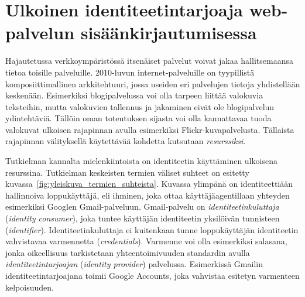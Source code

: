 \documentclass[finnish,gradu]{tktltiki}
\begin{document}



\newpage
\section{Ulkoinen identiteetintarjoaja web-palvelun sisäänkirjautumisessa} %
\label{sec:kakkosluku}

  Hajautetussa verkkoympäristössä itsenäiset palvelut voivat jakaa hallitsemaansa tietoa toisille palveluille. 2010-luvun internet-palveluille on tyypillistä komposiittimallinen arkkitehtuuri, jossa useiden eri palvelujen tietoja yhdistellään keskenään. Esimerkiksi blogipalvelussa voi olla tarpeen liittää valokuvia teksteihin, mutta valokuvien tallennus ja jakaminen eivät ole blogipalvelun ydintehtäviä. Tällöin oman toteutuksen sijasta voi olla kannattavaa tuoda valokuvat ulkoisen rajapinnan avulla esimerkiksi Flickr-kuvapalvelusta. Tällaista rajapinnan välityksellä käytettävää kohdetta kutsutaan \emph{resurssiksi}.

  Tutkielman kannalta mielenkiintoista on identiteetin käyttäminen ulkoisena resurssina. Tutkielman keskeisten termien väliset suhteet on esitetty kuvassa~\ref{fig:yleiskuva_termien_suhteista}. Kuvassa ylimpänä on identiteettiään hallinnoiva loppukäyttäjä, eli ihminen, joka ottaa käyttäjäagentillaan yhteyden esimerkiksi Googlen Gmail-palveluun. Gmail-palvelu on \emph{identiteetinkuluttaja} (\emph{identity consumer}), joka tuntee käyttäjän identiteetin yksilöivän tunnisteen (\emph{identifier}). Identiteetinkuluttaja ei kuitenkaan tunne loppukäyttäjän identiteetin vahvistavaa varmennetta (\emph{credentials}). Varmenne voi olla esimerkiksi salasana, jonka oikeellisuus tarkistetaan yhteentoimivuuden standardin avulla \emph{identiteetintarjoajan} (\emph{identity provider}) palvelussa. Esimerkissä Gmailin identiteetintarjoajana toimii Google Accounts, joka vahvistaa esitetyn varmenteen kelpoisuuden.
\end{document}
